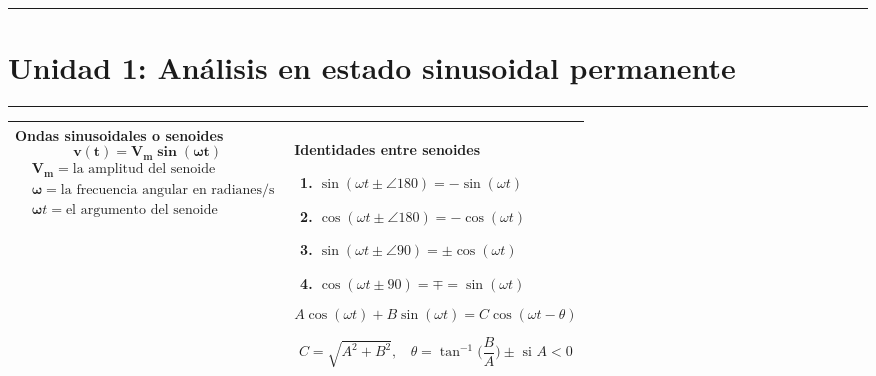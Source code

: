 \documentclass[../main.tex]{subfiles}
\begin{document}
\everymath{\displaystyle}
\renewcommand{\arraystretch}{1.4}
\hrule
\vspace*{-\baselineskip}
\vspace{0.05in}
\section{Unidad 1: Análisis en estado sinusoidal permanente}
\hrule
\begin{xltabular}{\textwidth}{|X|X|}
	\toprule
	\textbf{\large Ondas sinusoidales o senoides}
	$$\bm{v(t)=V_m\sin(\omega t)}$$
	$\begin{aligned}
			 & \bm{V_m} = \text{la amplitud del senoide}                \\
			 & \bm{\omega} = \text{la frecuencia angular en radianes/s} \\
			 & \bm{\omega} t = \text{el argumento del senoide}
		\end{aligned}$
	\newline\newline
	
	
	
	&
	\large\textbf{Identidades entre senoides}

	\begin{enumerate}
		\item $\sin(\omega t \pm\angle{180}) = -\sin(\omega t)$
		\item $\cos(\omega t \pm\angle{180})=-\cos(\omega t)$
		\item $\sin(\omega t \pm \angle{90})=\pm \cos(\omega t)$
		\item $\cos(\omega t \pm 90) = \mp = \sin(\omega t)$
	\end{enumerate}

	$$A\cos(\omega t) + B\sin(\omega t) = C \cos(\omega t-\theta)$$

	$$C = \sqrt{A^2 +B^2},~~~~\theta =\tan^{-1}\bigg(\frac{B}{A}\bigg)\pm \text{ si } A < 0$$

	

	

	

	

	
	\\
	\hline
\end{xltabular}
\end{document}
